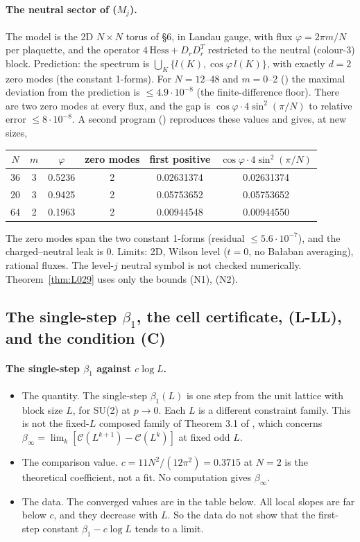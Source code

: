\paragraph{The neutral sector of ($M_j$).} The model is the 2D $N\times N$ torus of  \S6, in Landau gauge, with flux $\varphi=2\pi m/N$ per plaquette, and the operator $4\,\mathrm{Hess}+D_rD_r^T$ restricted to the neutral (colour-3) block. Prediction: the spectrum is $\bigcup_K\{l(K),\cos\varphi\,l(K)\}$, with exactly $d=2$ zero modes (the constant 1-forms). For $N=12$--48 and $m=0$--2 () the maximal deviation from the prediction is $\le4.9\cdot10^{-8}$ (the finite-difference floor). There are two zero modes at every flux, and the gap is $\cos\varphi\cdot4\sin^2(\pi/N)$ to relative error $\le8\cdot10^{-8}$. A second program () reproduces these values and gives, at new sizes,
\begin{longtable}{|c|c|c|c|c|c|}
\hline
$N$ & $m$ & $\varphi$ & zero modes & first positive & $\cos\varphi\cdot4\sin^2(\pi/N)$ \\ \hline
36 & 3 & 0.5236 & 2 & 0.02631374 & 0.02631374 \\ \hline
20 & 3 & 0.9425 & 2 & 0.05753652 & 0.05753652 \\ \hline
64 & 2 & 0.1963 & 2 & 0.00944548 & 0.00944550 \\ \hline
\end{longtable}
The zero modes span the two constant 1-forms (residual $\le5.6\cdot10^{-7}$), and the charged--neutral leak is 0. Limits: 2D, Wilson level ($t=0$, no Ba{\l}aban averaging), rational fluxes. The level-$j$ neutral symbol is not checked numerically. Theorem~\ref{thm:L029} uses only the bounds (N1), (N2).

\subsection{The single-step $\beta_1$, the cell certificate, (L-LL), and the condition (C)}\label{sec:numr8}

\paragraph{The single-step $\beta_1$ against $c\log L$.}
\begin{itemize}
\item The quantity. The single-step $\beta_1(L)$ is one step from the unit lattice with block size $L$, for SU(2) at $p\to0$. Each $L$ is a different constraint family. This is not the fixed-$L$ composed family of Theorem 3.1 of , which concerns $\beta_\infty=\lim_k[\mathcal C(L^{k+1})-\mathcal C(L^k)]$ at fixed odd $L$.
\item The comparison value. $c=11N^2/(12\pi^2)=0.3715$ at $N=2$ is the theoretical coefficient, not a fit. No computation gives $\beta_\infty$.
\item The data. The converged values are in the table below. All local slopes are far below $c$, and they decrease with $L$. So the data do not show that the first-step constant $\beta_1-c\log L$ tends to a limit.
\end{itemize}

